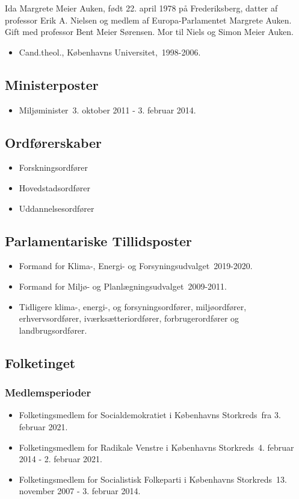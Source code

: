 \documentclass[11pt, a4paper]{awesome-cv}
\begin{document}
\makecvheader[R]
\makelettertitle
\begin{cvletter}
Ida Margrete Meier Auken, født 22. april 1978 på Frederiksberg, datter af professor Erik A. Nielsen og medlem af Europa-Parlamentet Margrete Auken. Gift med professor Bent Meier Sørensen. Mor til Niels og Simon Meier Auken.

\begin{itemize}
\item Cand.theol., Københavns Universitet, 1998-2006.
\end{itemize}
\subsection*{Ministerposter}
\begin{itemize}
\item Miljøminister 3. oktober 2011 - 3. februar 2014.
\end{itemize}
\subsection*{Ordførerskaber}
\begin{itemize}
\item Forskningsordfører
\item Hovedstadsordfører
\item Uddannelsesordfører
\end{itemize}
\subsection*{Parlamentariske Tillidsposter}
\begin{itemize}
\item Formand for Klima-, Energi- og Forsyningsudvalget 2019-2020.
\item Formand for Miljø- og Planlægningsudvalget 2009-2011.
\item Tidligere klima-, energi-, og forsyningsordfører, miljøordfører, erhvervsordfører, iværksætteriordfører, forbrugerordfører og landbrugsordfører.
\end{itemize}
\subsection*{Folketinget}
\subsubsection*{Medlemsperioder}
\begin{itemize}
\item Folketingsmedlem for Socialdemokratiet i Københavns Storkreds fra 3. februar 2021.
\item Folketingsmedlem for Radikale Venstre i Københavns Storkreds 4. februar 2014 - 2. februar 2021.
\item Folketingsmedlem for Socialistisk Folkeparti i Københavns Storkreds 13. november 2007 - 3. februar 2014.
\end{itemize}

\end{cvletter}
\end{document}
